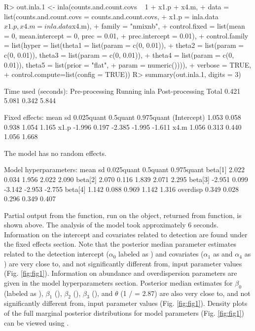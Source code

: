 \documentclass[codesnippet]{jss}
\begin{document}
\begin{CodeInput}
R> out.inla.1 <- inla(counts.and.count.covs ~ 1 + x1.p + x4.m,
+    data = list(counts.and.count.covs = counts.and.count.covs,
+      x1.p = inla.data$x1.p, x4.m = inla.data$x4.m),
+    family = "nmixnb",
+    control.fixed = list(mean = 0, mean.intercept = 0, prec = 0.01,
+      prec.intercept = 0.01),
+    control.family = list(hyper = list(theta1 = list(param = c(0, 0.01)),
+      theta2 = list(param = c(0, 0.01)), theta3 = list(param = c(0, 0.01)),
+      theta4 = list(param = c(0, 0.01)), theta5 = list(prior = "flat",
+      param = numeric()))),
+    verbose = TRUE,
+    control.compute=list(config = TRUE))
R> summary(out.inla.1, digits = 3)
\end{CodeInput}
\begin{CodeOutput}
Time used (seconds):
Pre-processing    Running inla    Post-processing    Total 
0.421             5.081           0.342              5.844 

Fixed effects:
              mean     sd  0.025quant 0.5quant  0.975quant
(Intercept)  1.053  0.058       0.938     1.054      1.165
x1.p        -1.996  0.197      -2.385    -1.995     -1.611
x4.m         1.056  0.313       0.440     1.056      1.668

The model has no random effects.

Model hyperparameters:
             mean      sd  0.025quant  0.5quant 0.975quant
beta[1]     2.022   0.034       1.956     2.022      2.090
beta[2]     2.070   0.116       1.839     2.071      2.295
beta[3]    -2.951   0.099      -3.142    -2.953     -2.755
beta[4]     1.142   0.088       0.969     1.142      1.316
overdisp    0.349   0.028       0.296     0.349      0.407
\end{CodeOutput}

Partial output from the  function, run on the  object, returned from  function, is shown above. The analysis of the model took approximately 6 seconds.  Information on the intercept and covariates related to detection are found under the fixed effects section.  Note that the posterior median parameter estimates related to the detection intercept ($\alpha_0$ labeled as ) and covariates ($\alpha_1$ as  and $\alpha_4$ as ) are very close to, and not significantly different from, input parameter values (Fig. \ref{fig:fig1}). Information on abundance and overdispersion parameters are given in the model hyperparameters section. Posterior median estimates for $\beta_0$ (labeled as ), $\beta_1$ (), $\beta_2$ (), $\beta_3$ (), and $\theta$ (1 /  = 2.87) are also very close to, and not significantly different from, input parameter values (Fig. \ref{fig:fig1}). Density plots of the full marginal posterior distributions for model parameters (Fig. \ref{fig:fig1}) can be viewed using .
\end{document}

